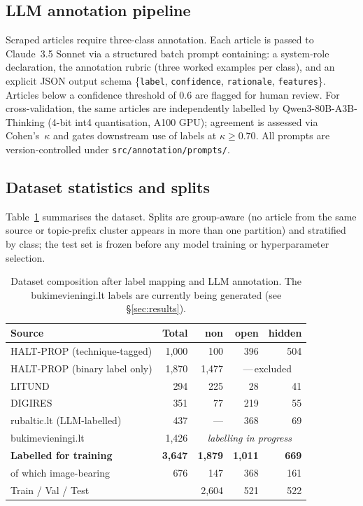 \documentclass[12pt,a4paper]{article}
\begin{document}
\subsection{LLM annotation pipeline}

Scraped articles require three-class annotation.
Each article is passed to Claude~3.5 Sonnet via a structured batch prompt
containing: a system-role declaration, the annotation rubric (three worked
examples per class), and an explicit JSON output schema
\{\texttt{label}, \texttt{confidence}, \texttt{rationale}, \texttt{features}\}.
Articles below a confidence threshold of 0.6 are flagged for human review.
For cross-validation, the same articles are independently labelled by
Qwen3-80B-A3B-Thinking (4-bit int4 quantisation, A100 GPU);
agreement is assessed via Cohen's~$\kappa$ and gates downstream use of labels
at $\kappa \geq 0.70$.
All prompts are version-controlled under \texttt{src/annotation/prompts/}.

\subsection{Dataset statistics and splits}

Table~\ref{tab:data} summarises the dataset.
Splits are group-aware (no article from the same source or topic-prefix cluster
appears in more than one partition) and stratified by class;
the test set is frozen before any model training or hyperparameter selection.

\begin{table}[H]
\centering
\caption{Dataset composition after label mapping and LLM annotation.
The bukimevieningi.lt labels are currently being generated (see \S\ref{sec:results}).}
\label{tab:data}
\begin{tabular}{lrrrr}
\toprule
Source & Total & non & open & hidden \\
\midrule
HALT-PROP (technique-tagged) & 1,000 & 100 & 396 & 504 \\
HALT-PROP (binary label only) & 1,870 & 1,477 & \multicolumn{2}{c}{---\,excluded} \\
LITUND & 294 & 225 & 28 & 41 \\
DIGIRES & 351 & 77 & 219 & 55 \\
rubaltic.lt (LLM-labelled) & 437 & --- & 368 & 69 \\
bukimevieningi.lt & 1,426 & \multicolumn{3}{c}{\textit{labelling in progress}} \\
\midrule
\textbf{Labelled for training} & \textbf{3,647} & \textbf{1,879} & \textbf{1,011} & \textbf{669} \\
\quad of which image-bearing & 676 & 147 & 368 & 161 \\
\midrule
Train / Val / Test & & 2,604 & 521 & 522 \\
\bottomrule
\end{tabular}
\end{table}
\end{document}
